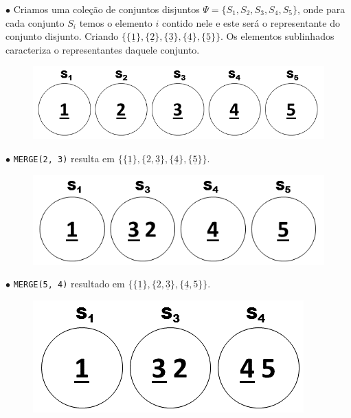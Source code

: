 \documentclass[
	12pt,				%
	openany,
	oneside,
	a4paper,			%
	english,			%
	brazil				%
	]{abntex2}
\begin{document}
  \begin{alineas}
  \item[$\bullet$]
    Criamos uma coleção de conjuntos disjuntos $\Psi  = \{S_1, S_2, S_3, S_4, S_5\}$, onde para cada conjunto $S_i$ temos o elemento $i$ contido nele e este será o representante do conjunto disjunto. Criando $\{ \{\underline{1}\}, \{\underline{2}\}, \{\underline{3}\}, \{\underline{4}\}, \{\underline{5}\}\}$. Os elementos sublinhados caracteriza o representantes daquele conjunto.
    \begin{figure}[!ht]
      \centering
      \vspace{-0.3cm}
      \includegraphics[scale=0.4]{unionFind_exemplo1.png}
      \vspace{-0.5cm}
    \end{figure}

  \item[$\bullet$]
    \texttt{MERGE(2, 3)} resulta em $\{ \{\underline{1}\}, \{2, \underline{3}\}, \{\underline{4}\}, \{\underline{5}\}\}$.
    \begin{figure}[H]
      \centering
      \vspace{-0.3cm}
      \includegraphics[scale=0.4]{unionFind_exemplo2.png}
      \vspace{-0.5cm}
    \end{figure}


  \item[$\bullet$]
    \texttt{MERGE(5, 4)} resultado em $\{ \{\underline{1}\}, \{2, \underline{3}\}, \{\underline{4}, 5\}\}$.
    \begin{figure}[H]
      \centering
      \vspace{-0.3cm}
      \includegraphics[scale=0.4]{unionFind_exemplo3.png}
      \vspace{-0.5cm}
    \end{figure}


\end{alineas}
\end{document}
